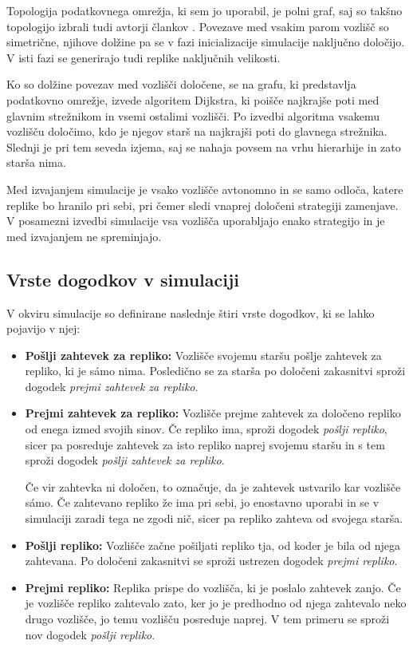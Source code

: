 \documentclass[a4paper, 12pt]{book}
\begin{document}
Topologija podatkovnega omrežja, ki sem jo uporabil, je polni graf, saj so
takšno topologijo izbrali tudi avtorji člankov \cite{efs2011, mfs2012}.
Povezave med vsakim parom vozlišč so simetrične, njihove dolžine pa se v fazi
inicializacije simulacije naključno določijo. V isti fazi se generirajo tudi
replike naključnih velikosti.

Ko so dolžine povezav med vozlišči določene, se na grafu, ki predstavlja
podatkovno omrežje, izvede algoritem Dijkstra, ki poišče najkrajše poti med
glavnim strežnikom in vsemi ostalimi vozlišči. Po izvedbi algoritma vsakemu
vozlišču določimo, kdo je njegov starš na najkrajši poti do glavnega strežnika.
Slednji je pri tem seveda izjema, saj se nahaja povsem na vrhu hierarhije in
zato starša nima.

Med izvajanjem simulacije je vsako vozlišče avtonomno in se samo odloča, katere
replike bo hranilo pri sebi, pri čemer sledi vnaprej določeni strategiji
zamenjave. V posamezni izvedbi simulacije vsa vozlišča uporabljajo enako
strategijo in je med izvajanjem ne spreminjajo.

\subsection{Vrste dogodkov v simulaciji}
V okviru simulacije so definirane naslednje štiri vrste dogodkov, ki se lahko
pojavijo v njej:

\begin{itemize}
  \item \textbf{Pošlji zahtevek za repliko:} Vozlišče svojemu staršu pošlje
  zahtevek za repliko, ki je sámo nima. Posledično se za starša po določeni
  zakasnitvi sproži dogodek \textit{prejmi zahtevek za repliko}.

  \item \textbf{Prejmi zahtevek za repliko:} Vozlišče prejme zahtevek za
  določeno repliko od enega izmed svojih sinov. Če repliko ima, sproži dogodek
  \textit{pošlji repliko}, sicer pa posreduje zahtevek za isto repliko
  naprej svojemu staršu in s tem sproži dogodek \textit{pošlji zahtevek za
  repliko}.

  Če vir zahtevka ni določen, to označuje, da je zahtevek ustvarilo kar
  vozlišče sámo. Če zahtevano repliko že ima pri sebi, jo enostavno
  uporabi in se v simulaciji zaradi tega ne zgodi nič, sicer pa repliko
  zahteva od svojega starša.

  \item \textbf{Pošlji repliko:} Vozlišče začne pošiljati repliko tja, od
  koder je bila od njega zahtevana. Po določeni zakasnitvi se sproži ustrezen
  dogodek \textit{prejmi repliko}.

  \item \textbf{Prejmi repliko:} Replika prispe do vozlišča, ki je poslalo
  zahtevek zanjo. Če je vozlišče repliko zahtevalo zato, ker jo je predhodno
  od njega zahtevalo neko drugo vozlišče, jo temu vozlišču posreduje naprej.
  V tem primeru se sproži nov dogodek \textit{pošlji repliko}.
\end{itemize}
\end{document}

